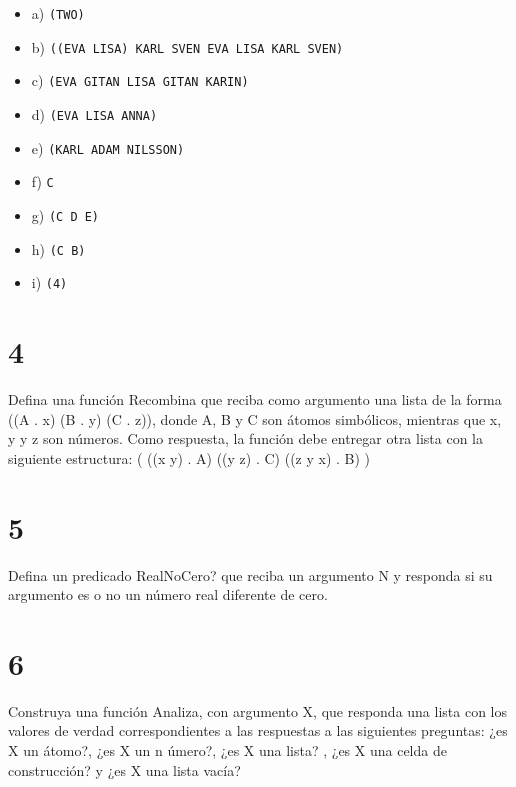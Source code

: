 \documentclass[fleqn, journal, onecolumn]{IEEEtran}             %
\theoremstyle{break}                                            %
\begin{document}
        \begin{itemize}
            \item a) \texttt{(TWO)}
            \item b) \texttt{((EVA LISA) KARL SVEN EVA LISA KARL SVEN)}
            \item c) \texttt{(EVA GITAN LISA GITAN KARIN)}
            \item d) \texttt{(EVA LISA ANNA)}
            \item e) \texttt{(KARL ADAM NILSSON)}
            \item f) \texttt{C}
            \item g) \texttt{(C D E)}
            \item h) \texttt{(C B)}
            \item i) \texttt{(4)}
        \end{itemize}

    \section{4}

        Defina una función Recombina que reciba como argumento una lista de la forma ((A . x)
        (B . y) (C . z)), donde A, B y C son átomos simbólicos, mientras que x, y y z son
        números. Como respuesta, la función debe entregar otra lista con la siguiente estructura:
        ( ((x y) . A) ((y z) . C) ((z y x) . B) )
        

    \section{5}

        Defina un predicado RealNoCero? que reciba un argumento N y responda si su
        argumento es o no un número real diferente de cero.
        

    \section{6}

        Construya una función Analiza, con argumento X, que responda una lista con los valores
        de verdad correspondientes a las respuestas a las siguientes preguntas: ¿es X un átomo?,
        ¿es X un n úmero?, ¿es X una lista? , ¿es X una celda de construcción? y ¿es X una
        lista vacía?
        
\end{document}
